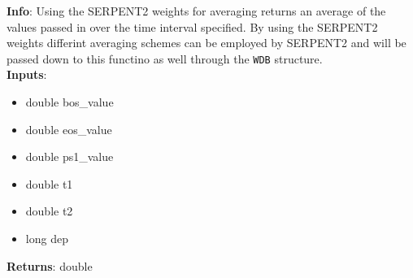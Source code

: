 \textbf{Info}: Using the SERPENT2 weights for averaging returns an average
of the values passed in over the time interval specified. By using the SERPENT2
weights differint averaging schemes can be employed by SERPENT2 and will be
passed down to this functino as well through the \texttt{WDB} structure.\\

\noindent \textbf{Inputs}:
\begin{itemize}
\item{double bos\_value}
\item{double eos\_value}
\item{double ps1\_value}
\item{double t1}
\item{double t2}
\item{long dep}
\end{itemize}

\noindent \textbf{Returns}: double
